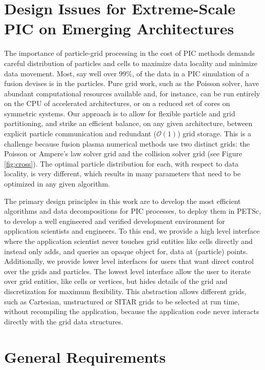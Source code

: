 \documentclass[review]{siamart}
\newcommand{\Order}[1]{\ensuremath{\mathcal{O}(#1)}}    %
\begin{document}
\section{Design Issues for Extreme-Scale PIC on Emerging Architectures}

The importance of particle-grid processing in the cost of PIC methods demands careful distribution of particles and cells to maximize data locality and minimize data movement.
Most, say well over $99\%$, of the data in a PIC simulation of a fusion devises is in the particles.
Pure grid work, such as the Poisson solver, have abundant computational resources available and, for instance, can be run entirely on the CPU of accelerated architectures, or on a reduced set of cores on symmetric systems.
Our approach is to allow for flexible particle and grid partitioning, and strike an efficient balance, on any given architecture, between explicit particle communication and redundant (\Order{1}) grid storage.
This is a challenge because fusion plasma numerical methods use two distinct grids: the Poisson or Ampere's law solver grid and the collision solver grid (see Figure \ref{fig:cross}).
The optimal particle distribution for each, with respect to data locality, is very different, which results in many parameters that need to be optimized in any given algorithm.

The primary design principles in this work are to develop the most efficient algorithms and data decompositions for PIC processes, to deploy them in PETSc, to develop a well engineered and verified development environment for application scientists and engineers.
To this end, we provide a high level interface where the application scientist never touches grid entities like cells directly and instead only adds, and queries an opaque object for, data at (particle) points.
Additionally, we provide lower level interfaces for users that want direct control over the grids and particles.
The lowest level interface allow the user to iterate over grid entities, like cells or vertices, but hides details of the grid and discretization for maximum flexibility.
This abstraction allows different grids, such as Cartesian, unstructured or SITAR grids to be selected at run time, without recompiling the application, because the application code never interacts directly with the grid data structures.

\section{General Requirements}
\end{document}
